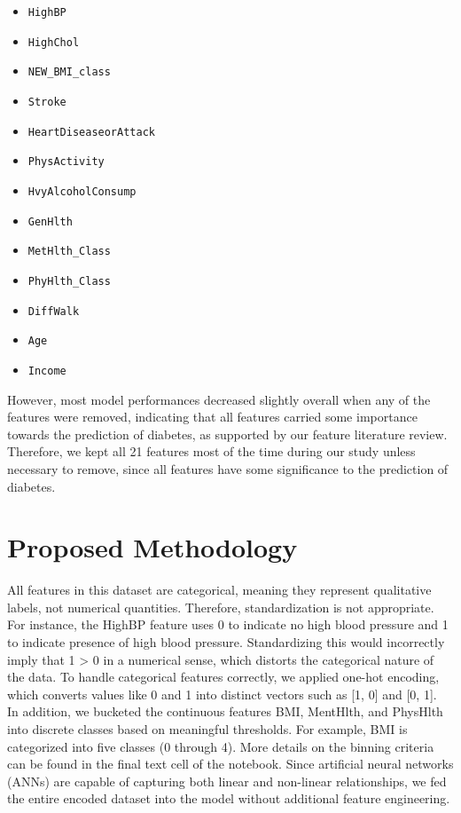 \documentclass[conference]{IEEEtran}
\begin{document}
\begin{itemize}
  \item \texttt{HighBP}
  \item \texttt{HighChol}
  \item \texttt{NEW\_BMI\_class}
  \item \texttt{Stroke}
  \item \texttt{HeartDiseaseorAttack}
  \item \texttt{PhysActivity}
  \item \texttt{HvyAlcoholConsump}
  \item \texttt{GenHlth}
  \item \texttt{MetHlth\_Class}
  \item \texttt{PhyHlth\_Class}
  \item \texttt{DiffWalk}
  \item \texttt{Age}
  \item \texttt{Income}
\end{itemize}
\vspace{1em}

However, most model performances decreased slightly overall when any of the features were removed, indicating that all features carried some importance towards the prediction of diabetes, as supported by our feature literature review.  Therefore, we kept all 21 features most of the time during our study unless necessary to remove, since all features have some significance to the prediction of diabetes.\\


\section{Proposed Methodology}
All features in this dataset are categorical, meaning they represent qualitative labels, not numerical quantities. Therefore, standardization is not appropriate. For instance, the HighBP feature uses 0 to indicate no high blood pressure and 1 to indicate presence of high blood pressure. Standardizing this would incorrectly imply that 1 > 0 in a numerical sense, which distorts the categorical nature of the data. To handle categorical features correctly, we applied one-hot encoding, which converts values like 0 and 1 into distinct vectors such as [1, 0] and [0, 1].\\ 

In addition, we bucketed the continuous features BMI, MentHlth, and PhysHlth into discrete classes based on meaningful thresholds. For example, BMI is categorized into five classes (0 through 4). More details on the binning criteria can be found in the final text cell of the notebook. Since artificial neural networks (ANNs) are capable of capturing both linear and non-linear relationships, we fed the entire encoded dataset into the model without additional feature engineering.\\
\end{document}
